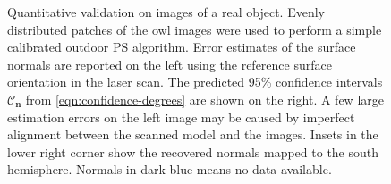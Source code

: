 \begin{figure}[t]
\begin{minipage}{0.5\linewidth}
    \end{minipage}
    \caption[Qualitative validation on images of a real object]{Quantitative validation on images of a real object. Evenly distributed patches of the owl images were used to perform a simple calibrated outdoor PS algorithm. Error estimates of the surface normals are reported on the left using the reference surface orientation in the laser scan. The predicted 95\% confidence intervals $\mathcal{C}_\mathbf{n}$ from \eqref{eqn:confidence-degrees} are shown on the right. A few large estimation errors on the left image may be caused by imperfect alignment between the scanned model and the images. Insets in the lower right corner show the recovered normals mapped to the south hemisphere. Normals in dark blue means no data available.}
    \label{fig:reconstruction:results}
\end{figure}






